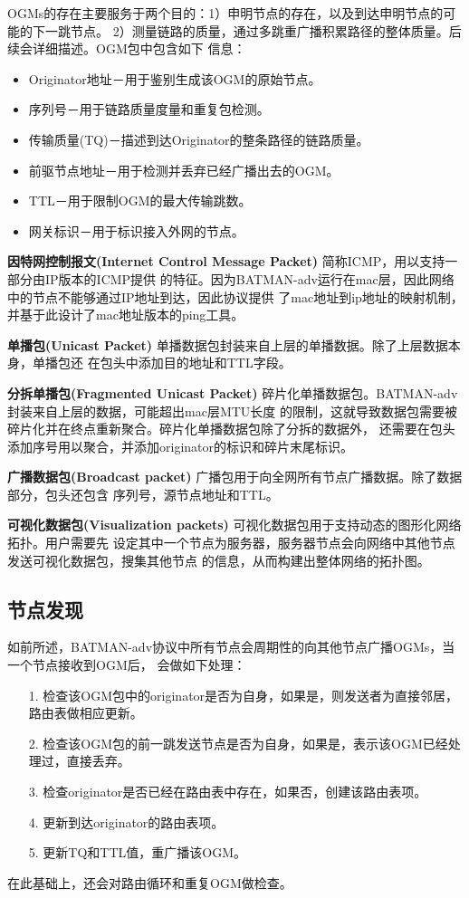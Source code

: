 OGMs的存在主要服务于两个目的：1）申明节点的存在，以及到达申明节点的可能的下一跳节点。
2）测量链路的质量，通过多跳重广播积累路径的整体质量。后续会详细描述。OGM包中包含如下
信息：
\begin{itemize}
\item Originator地址－用于鉴别生成该OGM的原始节点。
\item 序列号－用于链路质量度量和重复包检测。
\item 传输质量(TQ)－描述到达Originator的整条路径的链路质量。
\item 前驱节点地址－用于检测并丢弃已经广播出去的OGM。
\item TTL－用于限制OGM的最大传输跳数。
\item 网关标识－用于标识接入外网的节点。
\end{itemize}

\textbf{因特网控制报文(Internet Control Message Packet)} 简称ICMP，用以支持一部分由IP版本的ICMP提供
的特征。因为BATMAN-adv运行在mac层，因此网络中的节点不能够通过IP地址到达，因此协议提供
了mac地址到ip地址的映射机制，并基于此设计了mac地址版本的ping工具。

\textbf{单播包(Unicast Packet)} 单播数据包封装来自上层的单播数据。除了上层数据本身，单播包还
在包头中添加目的地址和TTL字段。

\textbf{分拆单播包(Fragmented Unicast Packet)} 碎片化单播数据包。BATMAN-adv封装来自上层的数据，可能超出mac层MTU长度
的限制，这就导致数据包需要被碎片化并在终点重新聚合。碎片化单播数据包除了分拆的数据外，
还需要在包头添加序号用以聚合，并添加originator的标识和碎片末尾标识。

\textbf{广播数据包(Broadcast packet)} 广播包用于向全网所有节点广播数据。除了数据部分，包头还包含
序列号，源节点地址和TTL。

\textbf{可视化数据包(Visualization packets)} 可视化数据包用于支持动态的图形化网络拓扑。用户需要先
设定其中一个节点为服务器，服务器节点会向网络中其他节点发送可视化数据包，搜集其他节点
的信息，从而构建出整体网络的拓扑图。

\subsection{节点发现}
如前所述，BATMAN-adv协议中所有节点会周期性的向其他节点广播OGMs，当一个节点接收到OGM后，
会做如下处理：
\begin{itemize}
\item[1.] 检查该OGM包中的originator是否为自身，如果是，则发送者为直接邻居，路由表做相应更新。
\item[2.] 检查该OGM包的前一跳发送节点是否为自身，如果是，表示该OGM已经处理过，直接丢弃。
\item[3.] 检查originator是否已经在路由表中存在，如果否，创建该路由表项。
\item[4.] 更新到达originator的路由表项。
\item[5.] 更新TQ和TTL值，重广播该OGM。
\end{itemize}
在此基础上，还会对路由循环和重复OGM做检查。


